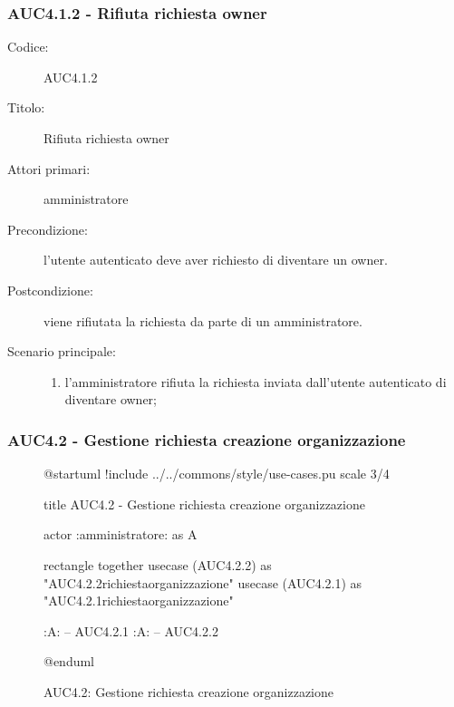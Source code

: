 \documentclass[casi-duso]{subfiles}
\begin{document}
\subsubsection{AUC4.1.2 - Rifiuta richiesta owner}%
\label{subsub:AUC4.1.2}
\begin{description}
  \item[Codice:] AUC4.1.2
  \item[Titolo:] Rifiuta richiesta owner
  \item[Attori primari:] amministratore
  \item[Precondizione:] l'utente autenticato deve aver richiesto di diventare un owner.
  \item[Postcondizione:] viene rifiutata la richiesta da parte di un amministratore.
  \item[Scenario principale:]
  \begin{enumerate}
    \item l'amministratore rifiuta la richiesta inviata dall'utente autenticato di diventare owner;
  \end{enumerate}
\end{description}

\subsubsection{AUC4.2 - Gestione richiesta creazione organizzazione}%
\label{subsub:AUC4.2}

\begin{figure}[h!] 
  \centering 
  \begin{plantuml}
  @startuml
  !include ../../commons/style/use-cases.pu
  scale 3/4

  title AUC4.2 - Gestione richiesta creazione organizzazione

  actor :amministratore: as A

  rectangle {
    together {
      usecase (AUC4.2.2) as "AUC4.2.2\nRifiuta richiesta\ncreazione organizzazione"
      usecase (AUC4.2.1) as "AUC4.2.1\nAccetta richiesta\ncreazione organizzazione"
    }
  }

  :A: -- AUC4.2.1
  :A: -- AUC4.2.2

  @enduml
  \end{plantuml} 
  \caption{AUC4.2: Gestione richiesta creazione organizzazione} 
  \label{fig:auc4_2} 
\end{figure}
\end{document}
